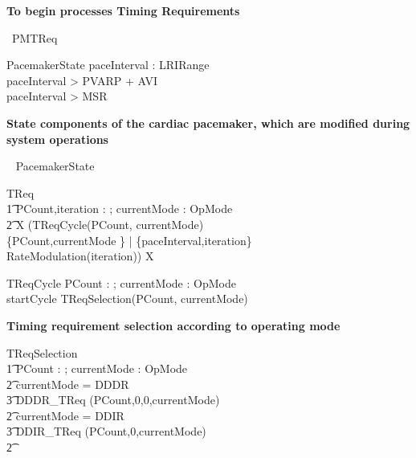 \begin{circus}
  \circend
\end{circus}





\hline
\textbf{To begin \Circus processes Timing Requirements}
\hline

\begin{circus}
	\circprocess\ PMTReq \circdef \circbegin
\end{circus}

\begin{schema}{PacemakerState}
  paceInterval : LRIRange  \\
  \where
  paceInterval > PVARP + AVI \\
  paceInterval > MSR \\
\end{schema}


\textbf{State components of the cardiac pacemaker, which are modified during system operations}

\begin{circusaction}
  \circstate ~ PacemakerState
\end{circusaction}

\begin{circusaction}
TReq \circdef \\
\t1 \circvres PCount,iteration : \nat ; \circvres currentMode : OpMode \\
\t2 \circspot \circmu X \circspot (TReqCycle(PCount, currentMode) \\
\linter \{PCount,currentMode \} | \{paceInterval,iteration\}  \rinter \\
RateModulation(iteration)) \circseq X \\
\end{circusaction}



\begin{circusaction}
	TReqCycle \circdef \circvres PCount : \nat ; \circvres currentMode : OpMode \circspot\\
	startCycle \then TReqSelection(PCount, currentMode)\\
\end{circusaction}


\textbf{ Timing requirement selection according to operating mode}\\
\begin{circusaction}
TReqSelection \circdef \\
\t1 \circvres PCount : \nat; \circvres currentMode : OpMode \circspot \\
\t2 \circif  currentMode = DDDR \circthen \\
\t3 DDDR\_TReq (PCount,0,0,currentMode) \\ 
\t2 \circelse currentMode = DDIR \circthen \\
\t3 DDIR\_TReq (PCount,0,currentMode)  \\ 
\t2 \circfi
\end{circusaction}




